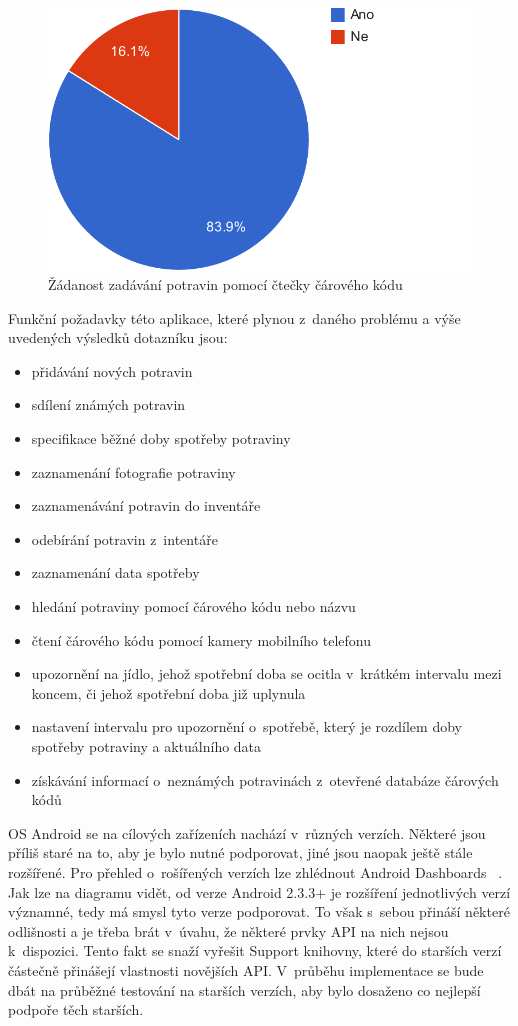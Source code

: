 \documentclass[thesis=B,czech]{FITthesis}[2013/10/20]
\begin{document}
\begin{figure}[H]
  \centering
  \includegraphics[scale=0.8]{charts/survey_scan}
  \caption{Žádanost zadávání potravin pomocí čtečky čárového kódu}
  \label{fig:SurveyScan}
\end{figure}

Funkční požadavky této aplikace, které plynou z~daného problému a výše uvedených výsledků dotazníku jsou:

\begin{itemize}
  \item přidávání nových potravin
  \item sdílení známých potravin
  \item specifikace běžné doby spotřeby potraviny
  \item zaznamenání fotografie potraviny
  \item zaznamenávání potravin do inventáře
  \item odebírání potravin z~intentáře
  \item zaznamenání data spotřeby
  \item hledání potraviny pomocí čárového kódu nebo názvu
  \item čtení čárového kódu pomocí kamery mobilního telefonu
  \item upozornění na jídlo, jehož spotřební doba se ocitla v~krátkém intervalu mezi koncem, či jehož spotřební doba již uplynula
  \item nastavení intervalu pro upozornění o~spotřebě, který je rozdílem doby spotřeby potraviny a aktuálního data
  \item získávání informací o~neznámých potravinách z~otevřené databáze čárových kódů
\end{itemize}

OS Android se na cílových zařízeních nachází v~různých verzích. Některé jsou příliš staré na to, aby je bylo nutné podporovat, jiné jsou naopak ještě stále rozšířené. Pro přehled o~rošířených verzích lze zhlédnout Android Dashboards ~\cite{dashboards}. Jak lze na diagramu vidět, od verze Android 2.3.3+ je rozšíření jednotlivých verzí významné, tedy má smysl tyto verze podporovat. To však s~sebou přináší některé odlišnosti a je třeba brát v~úvahu, že některé prvky API na nich nejsou k~dispozici. Tento fakt se snaží vyřešit Support knihovny, které do starších verzí částečně přinášejí vlastnosti novějších API. V~průběhu implementace se bude dbát na průběžné testování na starších verzích, aby bylo dosaženo co nejlepší podpoře těch starších.
\end{document}
